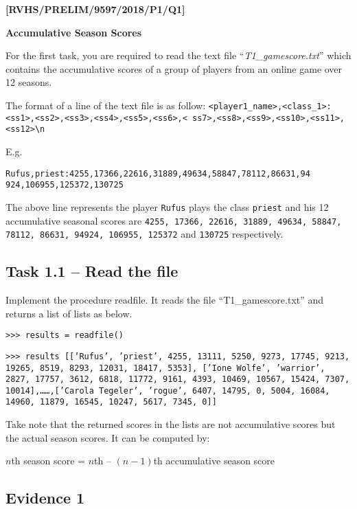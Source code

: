 \item \textbf{{[}RVHS/PRELIM/9597/2018/P1/Q1{]} }

\textbf{Accumulative Season Scores }

For the first task, you are required to read the text file \textquotedblleft \emph{T1\_gamescore.txt}\textquotedblright{}
which contains the accumulative scores of a group of players from
an online game over 12 seasons. 

The format of a line of the text file is as follow: \texttt{<player1\_name>,<class\_1>:<ss1>,<ss2>,<ss3>,<ss4>,<ss5>,<ss6>,<
ss7>,<ss8>,<ss9>,<ss10>,<ss11>,<ss12>\textbackslash n }

E.g.

\texttt{Rufus,priest:4255,17366,22616,31889,49634,58847,78112,86631,94
924,106955,125372,130725 }

The above line represents the player \texttt{Rufus} plays the class
\texttt{priest} and his 12 accumulative seasonal scores are \texttt{4255,
17366, 22616, 31889, 49634, 58847, 78112, 86631, 94924, 106955, 125372}
and \texttt{130725} respectively. 

\subsection*{Task 1.1 -- Read the file }

Implement the procedure readfile. It reads the file \textquotedblleft T1\_gamescore.txt\textquotedblright{}
and returns a list of lists as below. 

\noindent %
\noindent\begin{minipage}[t]{1\columnwidth}%
\texttt{>\textcompwordmark >\textcompwordmark > results = readfile() }

\texttt{>\textcompwordmark >\textcompwordmark > results {[}{[}'Rufus',
'priest', 4255, 13111, 5250, 9273, 17745, 9213, 19265, 8519, 8293,
12031, 18417, 5353{]}, {[}'Ione Wolfe', 'warrior', 2827, 17757, 3612,
6818, 11772, 9161, 4393, 10469, 10567, 15424, 7307, 10014{]},\dots \dots ,{[}'Carola
Tegeler', 'rogue', 6407, 14795, 0, 5004, 16084, 14960, 11879, 16545,
10247, 5617, 7345, 0{]}{]} }%
\end{minipage}

Take note that the returned scores in the lists are not accumulative
scores but the actual season scores. It can be computed by: 

$n$th season score = $n$th -- $(n-1)$th accumulative season score 

\subsection*{Evidence 1 }

